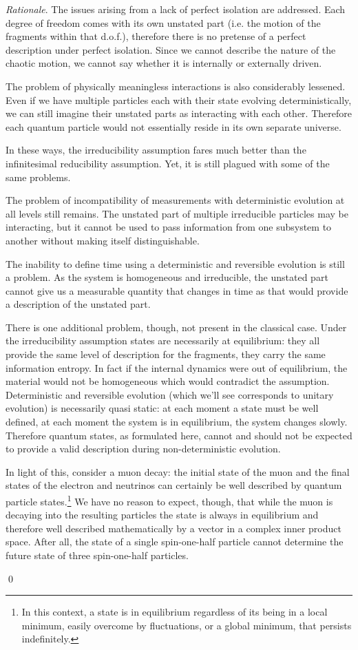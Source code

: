 \documentclass[aps,pra,10pt,twocolumn,floatfix,nofootinbib]{revtex4-1}
\numberwithin{equation}{section}
\theoremstyle{definition}
\newenvironment{rationale}{\emph{Rationale}.}{\qed}
\begin{document}
\begin{rationale}
	The issues arising from a lack of perfect isolation are addressed. Each degree of freedom comes with its own unstated part (i.e. the motion of the fragments within that d.o.f.), therefore there is no pretense of a perfect description under perfect isolation. Since we cannot describe the nature of the chaotic motion, we cannot say whether it is internally or externally driven.
	
	The problem of physically meaningless interactions is also considerably lessened. Even if we have multiple particles each with their state evolving deterministically, we can still imagine their unstated parts as interacting with each other. Therefore each quantum particle would not essentially reside in its own separate universe.
	
	In these ways, the irreducibility assumption fares much better than the infinitesimal reducibility assumption. Yet, it is still plagued with some of the same problems.
	
	The problem of incompatibility of measurements with deterministic evolution at all levels still remains. The unstated part of multiple irreducible particles may be interacting, but it cannot be used to pass information from one subsystem to another without making itself distinguishable.
	
	The inability to define time using a deterministic and reversible evolution is still a problem. As the system is homogeneous and irreducible, the unstated part cannot give us a measurable quantity that changes in time as that would provide a description of the unstated part.
	
	There is one additional problem, though, not present in the classical case. Under the irreducibility assumption states are necessarily at equilibrium: they all provide the same level of description for the fragments, they carry the same information entropy. In fact if the internal dynamics were out of equilibrium, the material would not be homogeneous which would contradict the assumption. Deterministic and reversible evolution (which we'll see corresponds to unitary evolution) is necessarily quasi static: at each moment a state must be well defined, at each moment the system is in equilibrium, the system changes slowly. Therefore quantum states, as formulated here, cannot and should not be expected to provide a valid description during non-deterministic evolution.
	
	In light of this, consider a muon decay: the initial state of the muon and the final states of the electron and neutrinos can certainly be well described by quantum particle states.\footnote{In this context, a state is in equilibrium regardless of its being in a local minimum, easily overcome by fluctuations, or a global minimum, that persists indefinitely.} We have no reason to expect, though, that while the muon is decaying into the resulting particles the state is always in equilibrium and therefore well described mathematically by a vector in a complex inner product space. After all, the state of a single spin-one-half particle cannot determine the future state of three spin-one-half particles.
	

\end{rationale}
\end{document}
